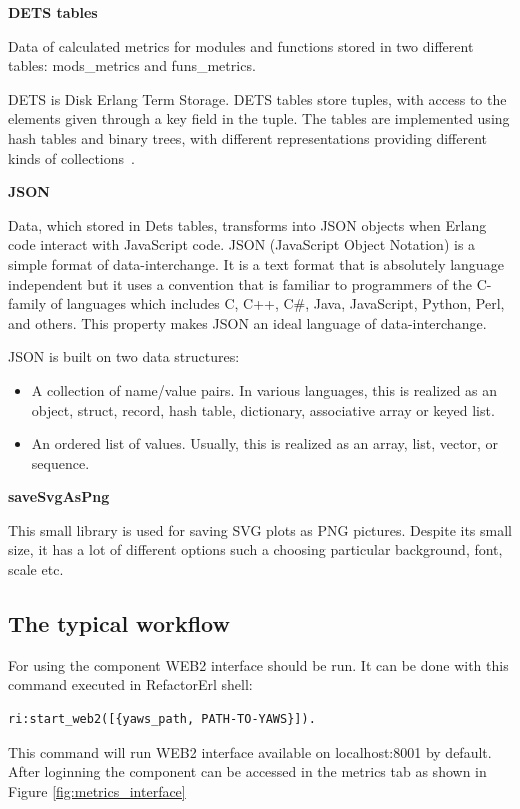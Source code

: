 \textbf{DETS tables}

Data of calculated metrics for modules and functions stored in two different tables: mods\_metrics and funs\_metrics.

DETS is Disk Erlang Term Storage. DETS tables store tuples, with access to the elements given through a  key field in the tuple. The tables are implemented using hash tables and binary trees, with different representations providing different kinds of collections~\cite{erland_o'reilly}.

\textbf{JSON}

Data, which stored in Dets tables, transforms into JSON objects when Erlang code interact with JavaScript code. JSON (JavaScript Object Notation) is a simple format of data-interchange. It is a text format that is absolutely language independent but it uses a convention that is familiar to programmers of the C-family of languages which includes C, C++, C\#, Java, JavaScript, Python, Perl, and others. This property makes JSON an ideal language of data-interchange.

JSON is built on two data structures:
\begin{itemize}
	\item A collection of name/value pairs. In various languages, this is realized as an object, struct, record, hash table, dictionary, associative array or keyed list.
	\item An ordered list of values. Usually, this is realized as an array, list, vector, or sequence.
\end{itemize}

\textbf{saveSvgAsPng}

This small library is used for saving SVG plots as PNG pictures. Despite its small size, it has a lot of different options such a choosing particular background, font, scale etc. 

\subsection{The typical workflow}

For using the component WEB2 interface should be run. It can be done with this command executed in RefactorErl shell:

\begin{lstlisting}[frame=none, numbers=none]
	ri:start_web2([{yaws_path, PATH-TO-YAWS}]).
\end{lstlisting}

This command will run WEB2 interface available on localhost:8001 by default. After loginning the component can be accessed in the metrics tab as shown in Figure \ref{fig:metrics_interface}


